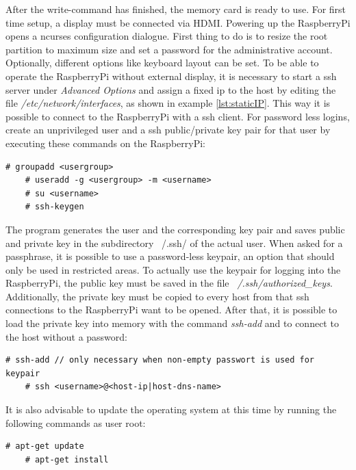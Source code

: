 After the write-command has finished, the memory card is ready to use. For first time setup, a display must be connected via HDMI. Powering up the RaspberryPi
opens a ncurses configuration dialogue. First thing to do is to resize the root partition to maximum size and set a password for the administrative
account. Optionally, different options like keyboard layout can be set.
To be able to operate the RaspberryPi without external display, it is necessary to start a \gls{ssh} server under \textit{Advanced Options} and assign a 
fixed \gls{ip} to the host by editing the file \textit{/etc/network/interfaces}, as shown in example \ref{lst:staticIP}. This way it is possible to connect to the
RaspberryPi with a \gls{ssh} client. For password less logins, create an unprivileged user and
 a \gls{ssh} public/private key pair for that user by executing these commands on the RaspberryPi:

\begin{lstlisting}[style=BashInputStyle]
    # groupadd <usergroup>
    # useradd -g <usergroup> -m <username>
    # su <username>
    # ssh-keygen
\end{lstlisting}
 
The program generates the user and the corresponding key pair and saves public and private key in the subdirectory ~/.ssh/ of the actual user. When asked for a passphrase, it is
possible to use a password-less keypair, an option that should only be used in restricted areas.
To actually use the keypair for logging into
the RaspberryPi, the public key must be saved in the file \textit{~/.ssh/authorized\_keys}. Additionally, the private key must be copied to every host
from that \gls{ssh} connections to the RaspberryPi want to be opened. After that, it is possible to load the private key into memory with the command \textit{ssh-add}
and to connect to the host without a password:

\begin{lstlisting}[style=BashInputStyle]
    # ssh-add // only necessary when non-empty passwort is used for keypair
    # ssh <username>@<host-ip|host-dns-name>
\end{lstlisting}

It is also advisable to update the operating system at this time by running the following commands as user root:

\begin{lstlisting}[style=BashInputStyle]
    # apt-get update
    # apt-get install
\end{lstlisting}

